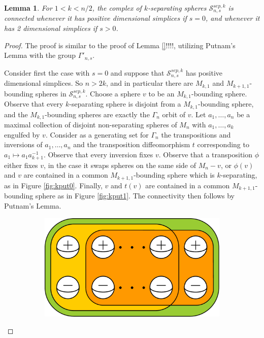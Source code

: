 \documentclass[11pt]{article}
\newtheorem{lemma}[theorem]{Lemma}
\theoremstyle{remark}
\theoremstyle{definition}
\begin{document}
\begin{lemma}
  \label{ksepconnect}
For $1<k<n/2$,
the complex of $k$-separating spheres
$\mathcal S^{sep,k}_{n,s}$
is connected whenever it has positive dimensional simplices if $s=0$,
and whenever it has 2 dimensional simplices if $s>0$.
\end{lemma}

\begin{proof}
The proof is similar to the proof of Lemma \ref{}!!!!,
utilizing Putnam's Lemma with the group $\Gamma'_{n,s}$.

Consider first the case with $s=0$
and suppose that $\mathcal S^{sep,k}_{n,s}$ has positive dimensional simplices.
So $n>2k$, and in particular
there are $M_{k,1}$ and $M_{k+1,1}$-bounding spheres in $\mathcal S^{sep,k}_{n,s}$.
Choose a sphere $v$ to be an $M_{k,1}$-bounding sphere.
Observe that every $k$-separating sphere is disjoint from a
$M_{k,1}$-bounding sphere, and the $M_{k,1}$-bounding spheres
are exactly the $\Gamma_n$ orbit of $v$.
Let $a_1,\ldots,a_n$ be a maximal collection of disjoint non-separating spheres
of $M_{n}$ with $a_1,\ldots, a_k$ engulfed by $v$.
Consider as a generating set for $\Gamma_n$
the transpositions and inversions of $a_1,\ldots,a_n$
and the transposition diffeomorphism $t$ corresponding to $a_1 \mapsto a_1a_{k+1}^{-1}$.
Observe that every inversion fixes $v$.
Observe that a transposition $\phi$ either fixes $v$, in the case it swaps
spheres on the same side of $M_n-v$, or $\phi(v)$ and $v$ are contained in a common
$M_{k+1,1}$-bounding sphere which is $k$-separating, as in Figure
\ref{fig:kput0}.
Finally, $v$ and $t(v)$ are contained in a common
$M_{k+1,1}$-bounding sphere as in Figure \ref{fig:kput1}.
The connectivity then follows by Putnam's Lemma.
\begin{figure}[b!]
    \centering
    \begin{subfigure}[b]{0.4\textwidth}
        \includegraphics[width=\textwidth]{figures/kput0.pdf}

\end{subfigure}
\end{figure}
\end{proof}
\end{document}
